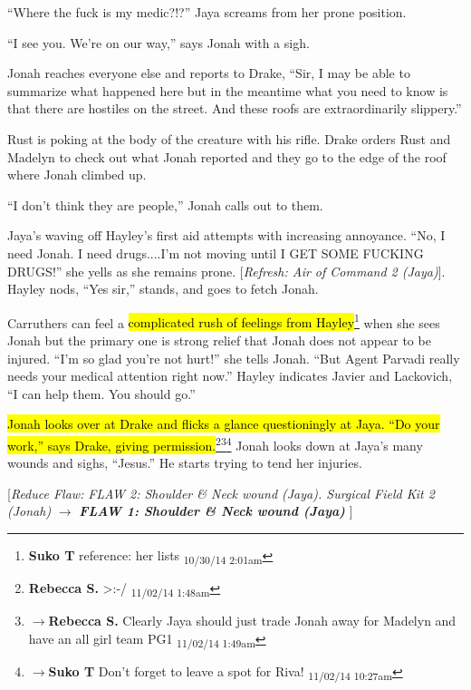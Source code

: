 ``Where the fuck is my medic?!?'' Jaya screams from her prone position.

``I see you.  We're on our way,'' says Jonah with a sigh.

Jonah reaches everyone else and reports to Drake, ``Sir, I may be able to summarize what happened here but in the meantime what you need to know is that there are hostiles on the street.  And these roofs are extraordinarily slippery.''

Rust is poking at the body of the creature with his rifle.  Drake orders Rust and Madelyn to check out what Jonah reported and they go to the edge of the roof where Jonah climbed up.

``I don't think they are people,'' Jonah calls out to them.



Jaya's waving off Hayley's first aid attempts with increasing annoyance.  ``No, I need Jonah.  I need drugs....I'm not moving until I GET SOME FUCKING DRUGS!'' she yells as she remains prone.  {[}\textit{Refresh: Air of Command 2 (Jaya)}{]}.  Hayley nods, ``Yes sir,'' stands, and goes to fetch Jonah.  

Carruthers can feel a \hl{complicated rush of feelings from Hayley}\footnote{\textbf{Suko T }reference: her lists \textsubscript{10/30/14 2:01am}} when she sees Jonah but the primary one is strong relief that Jonah does not appear to be injured.  ``I'm so glad you're not hurt!'' she tells Jonah.  ``But Agent Parvadi really needs your medical attention right now.''  Hayley indicates Javier and Lackovich, ``I can help them.  You should go.''

\hl{Jonah looks over at Drake and flicks a glance questioningly at Jaya.  ``Do your work,'' says Drake, giving permission.}\footnote{\textbf{Rebecca S. }\textgreater :-/ \textsubscript{11/02/14 1:48am}}\footnote{$\rightarrow$\textbf{Rebecca S. }Clearly Jaya should just trade Jonah away for Madelyn and have an all girl team PG1 \textsubscript{11/02/14 1:49am}}\footnote{$\rightarrow$\textbf{Suko T }Don't forget to leave a spot for Riva! \textsubscript{11/02/14 10:27am}}  Jonah looks down at Jaya's many wounds and sighs, ``Jesus.''  He starts trying to tend her injuries.

{[}\textit{Reduce Flaw: }\textit{ {\color[RGB]{255,0,0}FLAW 2: Shoulder \& Neck wound (Jaya). } }\textit{\textbf{ {\color[RGB]{255,0,0} } }}\textit{Surgical Field Kit 2 (Jonah)}\textit{ $\rightarrow$ }\textit{\textbf{ {\color[RGB]{255,0,0}FLAW 1: Shoulder \& Neck wound (Jaya)} }}{]} 

